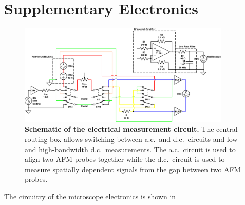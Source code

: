 \documentclass{article}
\begin{document}
\section{Supplementary Electronics}

\begin{figure}[bt]
\centering
\includegraphics[width=0.9\textwidth]{figures/tip_experiment_circuit_design}
\caption[Schematic of the electrical measurement circuit.]{\textbf{Schematic of the electrical measurement circuit.} The central routing box allows switching between a.c.\ and d.c.\ circuits and low-and high-bandwidth d.c.\ measurements. The a.c.\ circuit is used to align two AFM probes together while the d.c.\ circuit is used to measure spatially dependent signals from the gap between two AFM probes.}
\label{fig:circuit_design}
\end{figure}

The circuitry of the microscope electronics is shown in 
\end{document}
